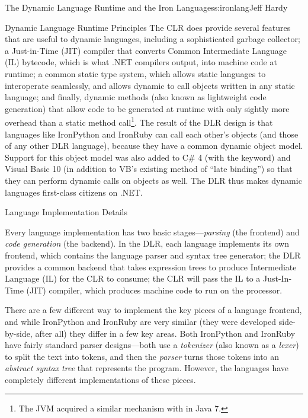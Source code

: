 \begin{aosachapter}{The Dynamic Language Runtime and the Iron Languages}{s:ironlang}{Jeff Hardy}
\begin{aosasect1}{Dynamic Language Runtime Principles}
The CLR does provide several features that are useful to dynamic
languages, including a sophisticated garbage collector; a Just-in-Time
(JIT) compiler that converts Common Intermediate Language (IL)
bytecode, which is what .NET compilers output, into machine code at
runtime; a common static type system, which allows static languages to
interoperate seamlessly, and allows dynamic to call objects written in
any static language; and finally, dynamic methods (also known as
lightweight code generation) that allow code to be generated at
runtime with only sightly more overhead than a static method
call\footnote{The JVM acquired a similar mechanism with
   in Java 7.}. The result of the DLR design is
that languages like IronPython and IronRuby can call each other's
objects (and those of any other DLR language), because they have a
common dynamic object model. Support for this object model was also
added to C\# 4 (with the  keyword) and Visual Basic 10
(in addition to VB's existing method of ``late binding'') so that they
can perform dynamic calls on objects as well. The DLR thus makes
dynamic languages first-class citizens on .NET.

\end{aosasect1}

\begin{aosasect1}{Language Implementation Details}

Every language implementation has two basic stages---\emph{parsing}
(the frontend) and \emph{code generation} (the backend). In the DLR,
each language implements its own frontend, which contains the language
parser and syntax tree generator; the DLR provides a common backend
that takes expression trees to produce Intermediate Language (IL) for
the CLR to consume; the CLR will pass the IL to a Just-In-Time (JIT)
compiler, which produces machine code to run on the processor.

There are a few different way to implement the key pieces of a
language frontend, and while IronPython and IronRuby are very similar
(they were developed side-by-side, after all) they differ in a few key
areas. Both IronPython and IronRuby have fairly standard parser
designs---both use a \emph{tokenizer} (also known as a \emph{lexer})
to split the text into tokens, and then the \emph{parser} turns those
tokens into an \emph{abstract syntax tree} that represents the
program. However, the languages have completely different
implementations of these pieces.

\end{aosasect1}


\end{aosachapter}
